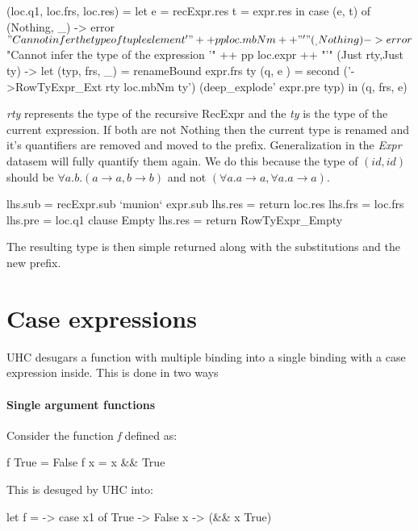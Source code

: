\begin{code}    
       (loc.q1, loc.frs, loc.res)
               = let e = recExpr.res
                     t = expr.res
                 in case (e, t) of
                      (Nothing, _) -> error $ "Cannot infer the type of tuple element '" ++ pp loc.mbNm ++ "'"
                      (_, Nothing) -> error $ "Cannot infer the type of the expression '" ++ pp loc.expr ++ "'"
                      (Just rty,Just ty) -> let (typ, frs, _) = renameBound expr.frs ty 
                                                (q,   e     ) = second (\ty'->RowTyExpr_Ext rty loc.mbNm ty') (deep_explode' expr.pre typ)
                                            in (q, frs, e)
\end{code}
\emph{rty} represents the type of the recursive RecExpr and the \emph{ty} is the type of the current expression. If both are not Nothing then the current type is renamed and it's quantifiers are removed and moved to the prefix. Generalization in the \emph{Expr} datasem will fully quantify them again. We do this because the type of $(id, id)$ should be $\forall a. b. (a \rightarrow a, b \rightarrow b)$ and not $(\forall a. a \rightarrow a, \forall a. a \rightarrow a)$.

\begin{code}                              
       lhs.sub = recExpr.sub `munion` expr.sub
       lhs.res = return loc.res
       lhs.frs = loc.frs
       lhs.pre = loc.q1
    clause Empty
       lhs.res = return RowTyExpr_Empty
\end{code}
The resulting type is then simple returned along with the substitutions and the new prefix. 

\section{Case expressions}
UHC desugars a function with multiple binding into a single binding with a case expression inside. This is done in two ways
\paragraph{Single argument functions}
Consider the function \emph{f} defined as:
\begin{code}
f True = False
f x    = x && True
\end{code}
This is desuged by UHC into:
\begin{code}
let f =  -> case x1 of
                 True -> False
                 x -> (&& x True)
\end{code}

